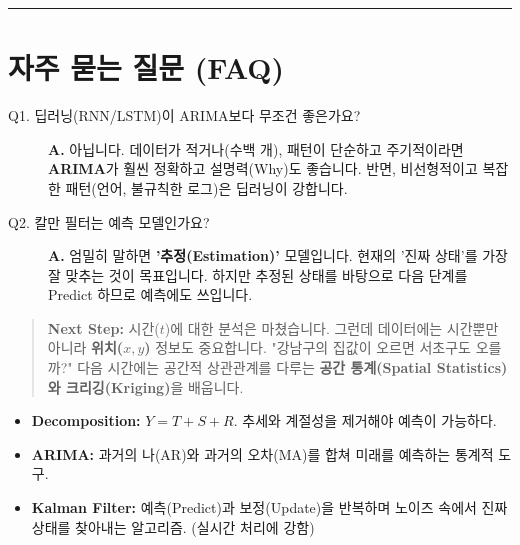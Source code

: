 \documentclass[11pt,a4paper]{book}
\theoremstyle{definition}
\begin{document}
\vspace{0.5cm}\hrule\vspace{0.5cm}

\section{자주 묻는 질문 (FAQ)}

\begin{description}
    \item[Q1. 딥러닝(RNN/LSTM)이 ARIMA보다 무조건 좋은가요?]
    \textbf{A.} 아닙니다. 데이터가 적거나(수백 개), 패턴이 단순하고 주기적이라면 \textbf{ARIMA}가 훨씬 정확하고 설명력(Why)도 좋습니다. 반면, 비선형적이고 복잡한 패턴(언어, 불규칙한 로그)은 딥러닝이 강합니다.
    
    \item[Q2. 칼만 필터는 예측 모델인가요?]
    \textbf{A.} 엄밀히 말하면 \textbf{'추정(Estimation)'} 모델입니다. 현재의 '진짜 상태'를 가장 잘 맞추는 것이 목표입니다. 하지만 추정된 상태를 바탕으로 다음 단계를 Predict 하므로 예측에도 쓰입니다.
\end{description}

\vspace{1cm}
\begin{quote}
\textbf{Next Step:} 시간($t$)에 대한 분석은 마쳤습니다. 그런데 데이터에는 시간뿐만 아니라 \textbf{위치($x, y$)} 정보도 중요합니다. "강남구의 집값이 오르면 서초구도 오를까?" 다음 시간에는 공간적 상관관계를 다루는 \textbf{공간 통계(Spatial Statistics)와 크리깅(Kriging)}을 배웁니다.
\end{quote}

\begin{summarybox}[title={Module 3 (Part A) 핵심 요약}]
\begin{itemize}
    \item \textbf{Decomposition:} $Y = T + S + R$. 추세와 계절성을 제거해야 예측이 가능하다.
    \item \textbf{ARIMA:} 과거의 나(AR)와 과거의 오차(MA)를 합쳐 미래를 예측하는 통계적 도구.
    \item \textbf{Kalman Filter:} 예측(Predict)과 보정(Update)을 반복하며 노이즈 속에서 진짜 상태를 찾아내는 알고리즘. (실시간 처리에 강함)
\end{itemize}
\end{summarybox}


\end{document}
